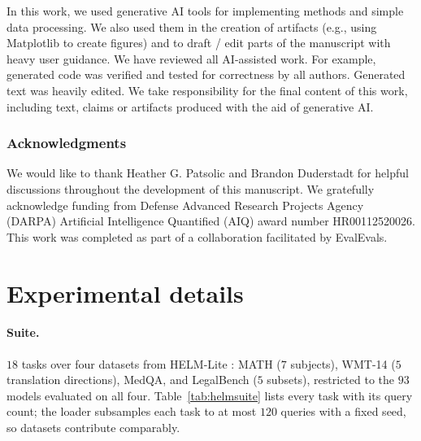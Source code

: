 \documentclass{article}
\theoremstyle{definition}
\theoremstyle{plain}
\begin{document}
In this work, we used generative AI tools for implementing methods and simple data processing.
We also used them in the creation of artifacts (e.g., using Matplotlib to create figures) and to draft / edit parts of the manuscript with heavy user guidance.
We have reviewed all AI-assisted work. 
For example, generated code was verified and tested for correctness by all authors.
Generated text was heavily edited.
We take responsibility for the final content of this work,
including text, claims or artifacts produced with the aid of generative AI.


\subsubsection*{Acknowledgments}
We would like to thank Heather G. Patsolic and Brandon Duderstadt for helpful discussions throughout the development of this manuscript.
We gratefully acknowledge funding from Defense Advanced Research Projects Agency (DARPA) Artificial Intelligence Quantified (AIQ) award number HR00112520026.
This work was completed as part of a collaboration facilitated by EvalEvals. 




\appendix
\section{Experimental details}
\label{app:details}

\paragraph{Suite.} $18$ tasks over four datasets from HELM-Lite \citep{helm}: MATH ($7$
subjects), WMT-14 ($5$ translation directions), MedQA, and LegalBench ($5$ subsets),
restricted to the $93$ models evaluated on all four. Table~\ref{tab:helmsuite} lists
every task with its query count; the loader subsamples each task to at most $120$
queries with a fixed seed, so datasets contribute comparably.
\end{document}
